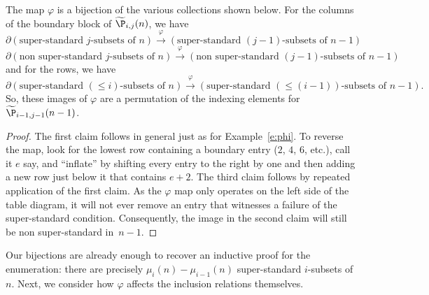 \begin{lemma}\label{l:sso_biject}
The map $\varphi$ is a bijection of the various collections shown below.  For the columns of the boundary block of $\widetilde\P_{i,j}(n)$, we have
\[ \partial\left( \text{super-standard $j$-subsets of $n$} \right)  \xrightarrow{\varphi} \left( \text{super-standard $(j-1)$-subsets of $n-1$} \right) \]
{\small \[ \partial\left( \text{non super-standard $j$-subsets of $n$} \right)  \xrightarrow{\varphi} \left( \text{non super-standard $(j-1)$-subsets of $n-1$} \right) \]}
and for the rows, we have
{\small \[ \partial\left( \text{super-standard $(\leq i)$-subsets of $n$} \right)  \xrightarrow{\varphi} \left( \text{super-standard $(\leq (i-1))$-subsets of $n-1$} \right). \]}
So, these images of $\varphi$ are a permutation of the indexing elements for $\widetilde\P_{i-1,j-1}(n-1)$.
\end{lemma}
\begin{proof}
The first claim follows in general just as for Example~\ref{e:phi}.  To reverse the map, look for the lowest row containing a boundary entry ($2$, $4$, $6$, etc.), call it $e$ say, and ``inflate'' by shifting every entry to the right by one and then adding a new row just below it that contains $e+2$.  The third claim follows by repeated application of the first claim.  As the $\varphi$ map only operates on the left side of the table diagram, it will not ever remove an entry that witnesses a failure of the super-standard condition.  Consequently, the image in the second claim will still be non super-standard in~\mbox{$n-1$}.
\end{proof}



Our bijections are already enough to recover an inductive proof for the enumeration: there are precisely $\mu_i(n) - \mu_{i-1}(n)$ super-standard $i$-subsets of $n$.  
Next, we consider how $\varphi$ affects the inclusion relations themselves.

